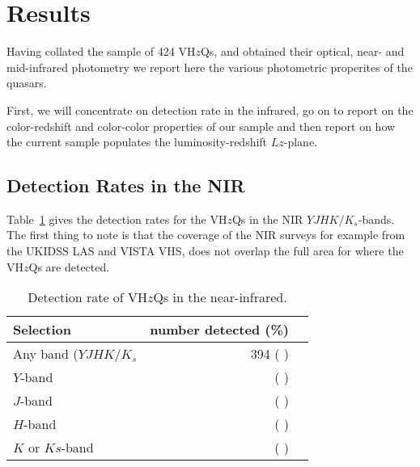 \documentclass[usenatbib]{mnras}
\begin{document}
\section{Results}
Having collated the sample of 424 VH$z$Qs, and obtained their optical,
near- and mid-infrared photometry we report here the various
photometric properites of the quasars.

First, we will concentrate on detection rate in the infrared, go on to
report on the color-redshift and color-color properties of our sample
and then report on how the current sample populates the
luminosity-redshift $Lz$-plane.


    \subsection{Detection Rates in the NIR}
    Table~\ref{tab:nir_detection} gives the detection rates for the 
    VH$z$Qs in the NIR $YJHK/K_{s}$-bands. 
    The first thing to note is that the coverage of the NIR surveys 
    for example from the UKIDSS LAS and VISTA VHS, does
    not overlap the full area for where the VH$z$Qs are detected. 

    \begin{table}
          \centering

      \begin{tabular}{l r l}
        \hline  \hline
        Selection   & number detected (\%) \\
        \hline  
        Any band ($YJHK/K_{s}$   &  394  ( ) \\
        $Y$-band    &    ( ) \\
        $J$-band    &    ( ) \\
        $H$-band    &    ( ) \\
        $K$ or $Ks$-band    &    ( ) \\
        \hline  \hline
      \end{tabular}
      \caption{Detection rate of VH$z$Qs in the near-infrared.}
      \label{tab:nir_detection}
    \end{table}
\end{document}
